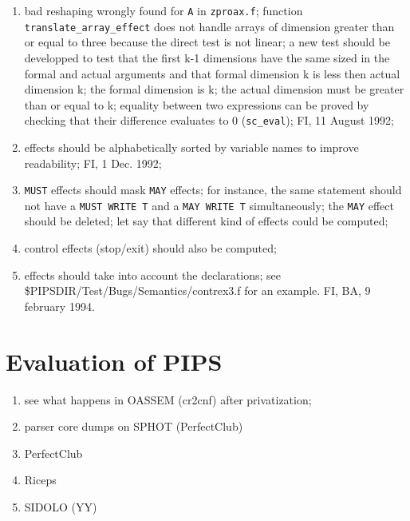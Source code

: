 \begin{enumerate}

  \item bad reshaping wrongly found for \verb+A+ in \verb+zproax.f+; function
        \verb+translate_array_effect+ does not handle arrays of dimension
        greater than or equal to three because the direct test is not
        linear; a new test should be developped to test that the first
        k-1 dimensions have the same sized in the formal and actual arguments
        and that formal dimension k is less then actual dimension k;
        the formal dimension is k; the actual dimension must be greater
        than or equal to k; equality between two expressions can be proved
        by checking that their difference evaluates to 0 (\verb+sc_eval+);
        FI, 11 August 1992;

  \item effects should be alphabetically sorted by variable names to
        improve readability; FI, 1 Dec. 1992;

  \item \verb+MUST+ effects should mask \verb+MAY+ effects; 
        for instance, the same
        statement should not have a \verb+MUST WRITE T+ and a
        \verb+MAY WRITE T+ simultaneously; the \verb+MAY+ effect
        should be deleted; let say that different kind of effects could
        be computed;

  \item control effects (stop/exit) should also be computed;

  \item effects should take into account the declarations; see
        \$PIPSDIR/Test/Bugs/Semantics/contrex3.f for an example. FI, BA,
        9 february 1994.
        

        
\end{enumerate}

\section{Evaluation of PIPS}

\begin{enumerate}

  \item see what happens in OASSEM (cr2cnf) after privatization;

  \item parser core dumps on SPHOT (PerfectClub)

  \item PerfectClub

  \item Riceps

  \item SIDOLO (YY)

\end{enumerate}

